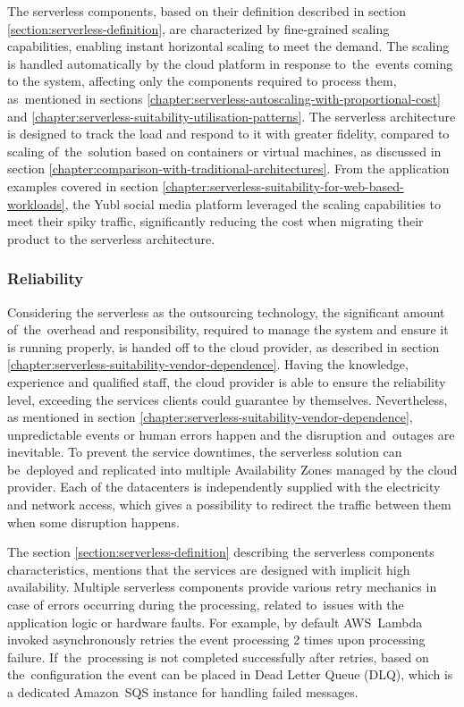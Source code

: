 The serverless components, based on their definition described in section \ref{section:serverless-definition}, are characterized by fine-grained scaling capabilities, enabling instant horizontal scaling to meet the demand.
The scaling is handled automatically by the cloud platform in response to~the~events coming to the system, affecting only the components required to process them, as~mentioned in sections \ref{chapter:serverless-autoscaling-with-proportional-cost} and \ref{chapter:serverless-suitability-utilisation-patterns}.
The serverless architecture is designed to track the load and respond to it with greater fidelity, compared to scaling of~the~solution based on containers or virtual machines, as discussed in section \ref{chapter:comparison-with-traditional-architectures}.
From the application examples covered in section \ref{chapter:serverless-suitability-for-web-based-workloads}, the Yubl social media platform leveraged the scaling capabilities to meet their spiky traffic, significantly reducing the cost when migrating their product to the serverless architecture.

\subsubsection{Reliability} \label{chapter:serverless-suitability-reliability}

Considering the serverless as the outsourcing technology, the significant amount of~the~overhead and responsibility, required to manage the system and ensure it is running properly, is handed off to the cloud provider, as described in section \ref{chapter:serverless-suitability-vendor-dependence}. Having the knowledge, experience and qualified staff, the cloud provider is able to ensure the reliability level, exceeding the services clients could guarantee by themselves. Nevertheless, as mentioned in section \ref{chapter:serverless-suitability-vendor-dependence}, unpredictable events or human errors happen and the disruption and~outages are inevitable. To prevent the service downtimes, the serverless solution can be~deployed and replicated into multiple Availability Zones managed by the cloud provider. Each of the datacenters is independently supplied with the electricity and network access, which gives a possibility to redirect the traffic between them when some disruption happens.

The section \ref{section:serverless-definition} describing the serverless components characteristics, mentions that the services are designed with implicit high availability. Multiple serverless components provide various retry mechanics in case of errors occurring during the processing, related to~issues with the application logic or hardware faults. For example, by default AWS~Lambda invoked asynchronously retries the event processing 2 times upon processing failure. If~the~processing is not completed successfully after retries, based on the~configuration the event can be placed in Dead Letter Queue (DLQ), which is a dedicated Amazon~SQS instance for handling failed messages.

